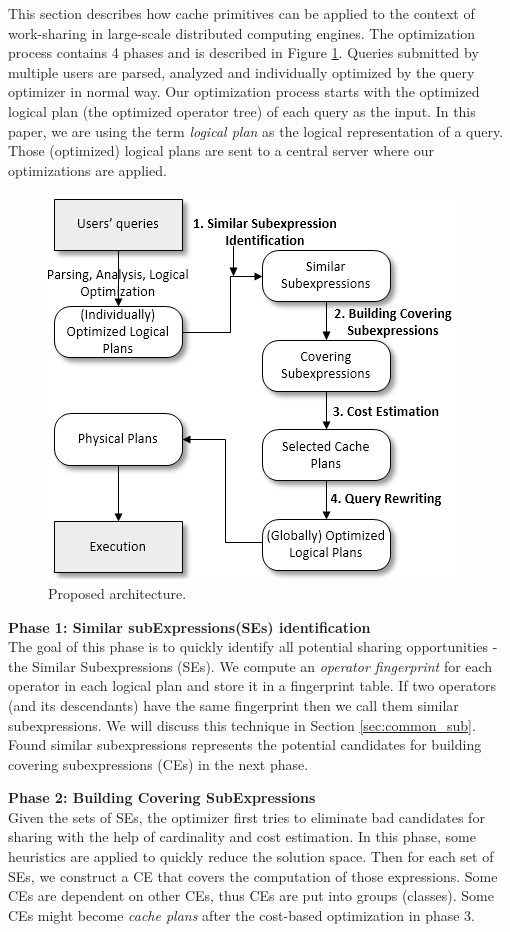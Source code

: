 This section describes how cache primitives can be applied to the context of work-sharing in large-scale distributed computing engines. The optimization process contains 4 phases and is described in Figure \ref{fig:phases_mqo}. Queries submitted by multiple users are parsed, analyzed and individually optimized by the query optimizer in normal way. Our optimization process starts with the optimized logical plan (the optimized operator tree) of each query as the input. In this paper, we are using the term \emph{logical plan} as the logical representation of a query. Those (optimized) logical plans are sent to a central server where our optimizations are applied.
\begin{figure}[!htb]
	\centering
 	\includegraphics[scale=0.7]{figures/phases_mqo}
   	\caption{Proposed architecture.} 
   	\label{fig:phases_mqo}
\end{figure}

\textbf{Phase 1: Similar subExpressions(SEs) identification}\\
The goal of this phase is to quickly identify all potential sharing opportunities - the Similar Subexpressions (SEs). We compute an \emph{operator fingerprint} for each operator in each logical plan and store it in a fingerprint table. If two operators (and its descendants) have the same fingerprint then we call them similar subexpressions. We will discuss this technique in Section \ref{sec:common_sub}. Found similar subexpressions represents the potential candidates for building covering subexpressions (CEs) in the next phase.

\textbf{Phase 2: Building Covering SubExpressions}\\
Given the sets of SEs, the optimizer first tries to eliminate bad candidates for sharing with the help of cardinality and cost estimation. In this phase, some heuristics are applied to quickly reduce the solution space. Then for each set of SEs, we construct a CE that covers the computation of those expressions. Some CEs are dependent on other CEs, thus CEs are put into groups (classes). Some CEs might become \emph{cache plans} after the cost-based optimization in phase 3.


